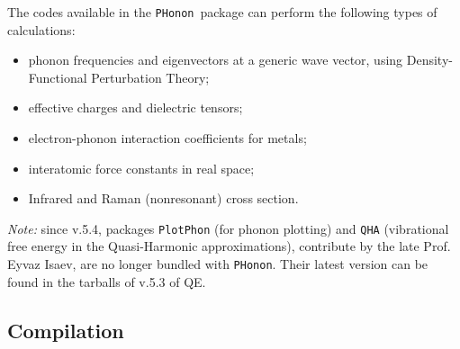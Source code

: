 \documentclass[12pt,a4paper]{article}
\def\PHonon{\texttt{PHonon}}
\begin{document}
The codes available in the \PHonon\ package can perform the following 
types of calculations:
\begin{itemize}
  \item phonon frequencies and eigenvectors at a generic wave vector,
  using Density-Functional Perturbation Theory;
  \item effective charges and dielectric tensors;
  \item electron-phonon interaction coefficients for metals;
  \item interatomic force constants in real space;
  \item Infrared and Raman (nonresonant) cross section.
\end{itemize}

{\em Note:} since v.5.4, packages \texttt{PlotPhon} (for phonon
plotting) and \texttt{QHA} (vibrational free energy in the
Quasi-Harmonic approximations), contribute by the late Prof.
Eyvaz Isaev, are no longer bundled with \PHonon. Their latest
version can be found in the tarballs of v.5.3 of QE.

\subsection{Compilation}
\end{document}
